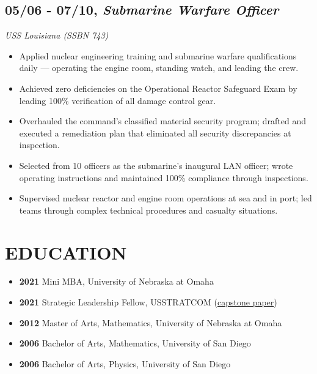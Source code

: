 \documentclass[10pt]{article}
\def\tightlist{}
\begin{document}
\subsection{\texorpdfstring{05/06 - 07/10, \textbf{\emph{Submarine
Warfare
Officer}}}{05/06 - 07/10, Submarine Warfare Officer}}\label{submarine-warfare-officer}

\emph{USS Louisiana (SSBN 743)}

\begin{itemize}
\tightlist
\item
  Applied nuclear engineering training and submarine warfare
  qualifications daily --- operating the engine room, standing watch,
  and leading the crew.
\item
  Achieved zero deficiencies on the Operational Reactor Safeguard Exam
  by leading 100\% verification of all damage control gear.
\item
  Overhauled the command's classified material security program; drafted
  and executed a remediation plan that eliminated all security
  discrepancies at inspection.
\item
  Selected from 10 officers as the submarine's inaugural LAN officer;
  wrote operating instructions and maintained 100\% compliance through
  inspections.
\item
  Supervised nuclear reactor and engine room operations at sea and in
  port; led teams through complex technical procedures and casualty
  situations.
\end{itemize}

\section{EDUCATION}\label{education}

\begin{itemize}
\tightlist
\item
  \textbf{2021} Mini MBA, University of Nebraska at Omaha
\item
  \textbf{2021} Strategic Leadership Fellow, USSTRATCOM
  (\href{https://resume.jasonwohlgemuth.com/SFLP_capstone.pdf}{capstone
  paper})
\item
  \textbf{2012} Master of Arts, Mathematics, University of Nebraska at
  Omaha
\item
  \textbf{2006} Bachelor of Arts, Mathematics, University of San Diego
\item
  \textbf{2006} Bachelor of Arts, Physics, University of San Diego
\end{itemize}
\end{document}
